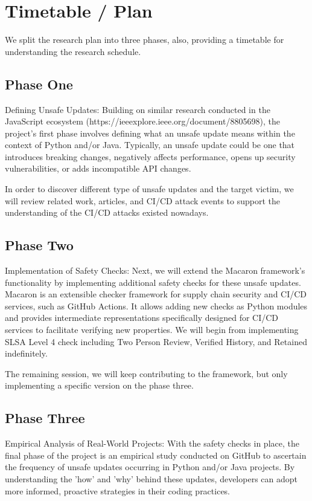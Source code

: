 \section{Timetable / Plan}
We split the research plan into three phases, also, providing a timetable for understanding 
the research schedule.

\subsection{Phase One}
Defining Unsafe Updates: Building on similar research conducted in the JavaScript ecosystem 
(https://ieeexplore.ieee.org/document/8805698), the project's first phase 
involves defining what an unsafe update means within the context of Python and/or Java. 
Typically, an unsafe update could be one that introduces breaking changes, 
negatively affects performance, opens up security vulnerabilities, 
or adds incompatible API changes.

In order to discover different type of unsafe updates and the target victim, we will review 
related work, articles, and CI/CD attack events to support the understanding of the CI/CD 
attacks existed nowadays. 

\subsection{Phase Two}
Implementation of Safety Checks: Next, we will extend the Macaron framework's 
functionality by implementing additional safety checks for these unsafe updates.
Macaron is an extensible checker framework for supply chain security and CI/CD services,
such as GitHub Actions. It allows adding new checks as Python modules and provides 
intermediate representations specifically designed for CI/CD services to facilitate 
verifying new properties. We will begin from implementing SLSA Level 4 check including Two 
Person Review, Verified History, and Retained indefinitely.

The remaining session, we will keep contributing to the framework, but only implementing a
specific version on the phase three.
\subsection{Phase Three}
Empirical Analysis of Real-World Projects: With the safety checks in place, 
the final phase of the project is an empirical study conducted on GitHub to ascertain
the frequency of unsafe updates occurring in Python and/or Java projects.
By understanding the 'how' and 'why' behind these updates, developers can adopt more 
informed, proactive strategies in their coding practices.

